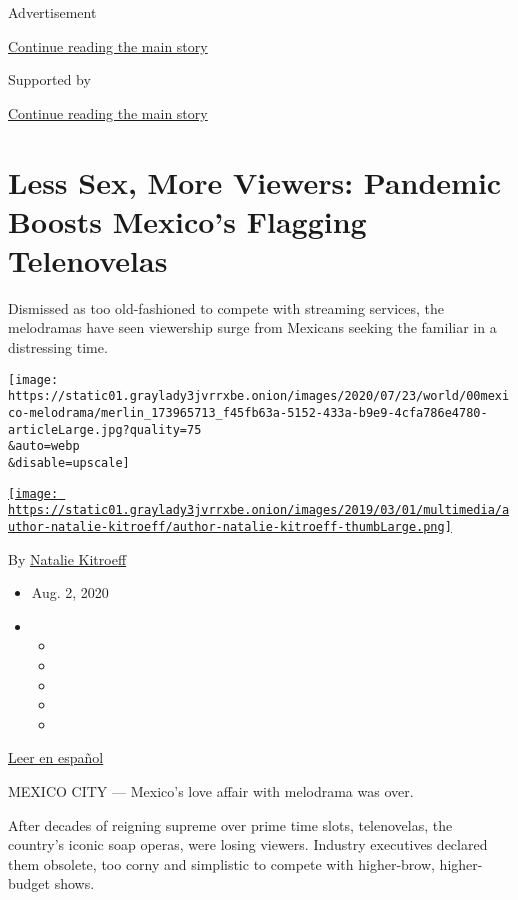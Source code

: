 Advertisement

\protect\hyperlink{after-top}{Continue reading the main story}

Supported by

\protect\hyperlink{after-sponsor}{Continue reading the main story}

\hypertarget{less-sex-more-viewers-pandemic-boosts-mexicos-flagging-telenovelas}{%
\section{Less Sex, More Viewers: Pandemic Boosts Mexico's Flagging
Telenovelas}\label{less-sex-more-viewers-pandemic-boosts-mexicos-flagging-telenovelas}}

Dismissed as too old-fashioned to compete with streaming services, the
melodramas have seen viewership surge from Mexicans seeking the familiar
in a distressing time.

\texttt{[image: https://static01.graylady3jvrrxbe.onion/images/2020/07/23/world/00mexico-melodrama/merlin\_173965713\_f45fb63a-5152-433a-b9e9-4cfa786e4780-articleLarge.jpg?quality=75\\\&auto=webp\\\&disable=upscale]}

\href{https://www.nytimes3xbfgragh.onion/by/natalie-kitroeff}{\texttt{[image: https://static01.graylady3jvrrxbe.onion/images/2019/03/01/multimedia/author-natalie-kitroeff/author-natalie-kitroeff-thumbLarge.png]}}

By \href{https://www.nytimes3xbfgragh.onion/by/natalie-kitroeff}{Natalie
Kitroeff}

\begin{itemize}
\item
  Aug. 2, 2020
\item
  \begin{itemize}
  \item
  \item
  \item
  \item
  \item
  \end{itemize}
\end{itemize}

\href{https://www.nytimes3xbfgragh.onion/es/2020/08/02/espanol/america-latina/televisa-rosa-de-guadalupe-netflix.html}{Leer
en español}

MEXICO CITY --- Mexico's love affair with melodrama was over.

After decades of reigning supreme over prime time slots, telenovelas,
the country's iconic soap operas, were losing viewers. Industry
executives declared them obsolete, too corny and simplistic to compete
with higher-brow, higher-budget shows.

